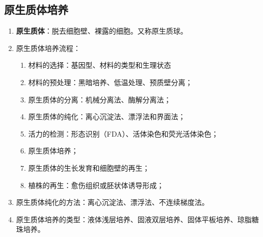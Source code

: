 \subsection{原生质体培养}
\begin{enumerate}
    \item \textbf{原生质体}：脱去细胞壁、裸露的细胞。又称原生质球。
    \item 原生质体培养流程：
    \begin{enumerate}
        \item 材料的选择：基因型、材料的类型和生理状态
        \item 材料的预处理：黑暗培养、低温处理、预质壁分离；
        \item 原生质体的分离：机械分离法、酶解分离法；
        \item 原生质体的纯化：离心沉淀法、漂浮法和界面法；
        \item 活力的检测：形态识别（FDA）、活体染色和荧光活体染色；
        \item 原生质体培养；
        \item 原生质体的生长发育和细胞壁的再生；
        \item 植株的再生：愈伤组织或胚状体诱导形成；
    \end{enumerate}
    \item 原生质体纯化的方法：离心沉淀法、漂浮法、不连续梯度法。
    \item 原生质体培养的类型：液体浅层培养、固液双层培养、固体平板培养、琼脂糖珠培养。
\end{enumerate}
